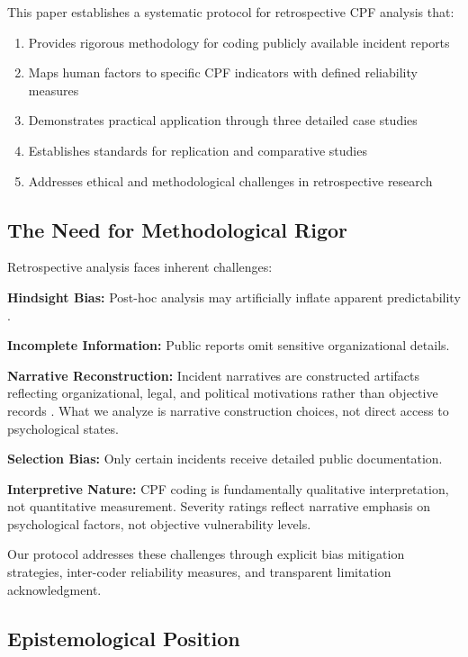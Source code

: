 \documentclass[11pt,a4paper]{article}
\begin{document}
This paper establishes a systematic protocol for retrospective CPF analysis that:

\begin{enumerate}
\item Provides rigorous methodology for coding publicly available incident reports
\item Maps human factors to specific CPF indicators with defined reliability measures
\item Demonstrates practical application through three detailed case studies
\item Establishes standards for replication and comparative studies
\item Addresses ethical and methodological challenges in retrospective research
\end{enumerate}

\subsection{The Need for Methodological Rigor}

Retrospective analysis faces inherent challenges:

\textbf{Hindsight Bias:} Post-hoc analysis may artificially inflate apparent predictability \cite{fischhoff1975}.

\textbf{Incomplete Information:} Public reports omit sensitive organizational details.

\textbf{Narrative Reconstruction:} Incident narratives are constructed artifacts reflecting organizational, legal, and political motivations rather than objective records \cite{woods2010}. What we analyze is narrative construction choices, not direct access to psychological states.

\textbf{Selection Bias:} Only certain incidents receive detailed public documentation.

\textbf{Interpretive Nature:} CPF coding is fundamentally qualitative interpretation, not quantitative measurement. Severity ratings reflect narrative emphasis on psychological factors, not objective vulnerability levels.

Our protocol addresses these challenges through explicit bias mitigation strategies, inter-coder reliability measures, and transparent limitation acknowledgment.

\subsection{Epistemological Position}
\end{document}
